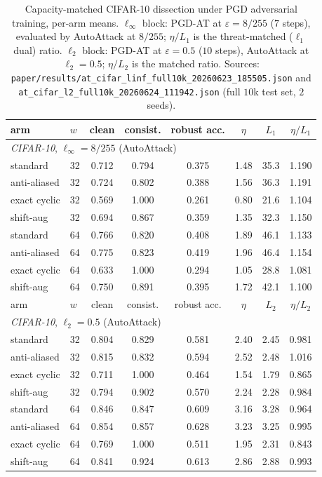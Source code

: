 \begin{table}[t]\centering
\caption{Capacity-matched CIFAR-10 dissection under PGD adversarial training,
per-arm means. $\ell_\infty$ block: PGD-AT at $\varepsilon{=}8/255$ ($7$ steps),
evaluated by AutoAttack at $8/255$; $\eta/L_1$ is the threat-matched ($\ell_1$
dual) ratio. $\ell_2$ block: PGD-AT at $\varepsilon{=}0.5$ ($10$ steps),
AutoAttack at $\ell_2{=}0.5$; $\eta/L_2$ is the matched ratio. Sources:
\texttt{paper/results/at\_cifar\_linf\_full10k\_20260623\_185505.json} and
\texttt{at\_cifar\_l2\_full10k\_20260624\_111942.json} (full $10$k test set,
$2$ seeds).}
\label{tab:at-cifar-full}
\footnotesize
\begin{tabular}{ll ccc cc c}
\toprule
arm & $w$ & clean & consist. & robust acc. & $\eta$ & $L_1$ & $\eta/L_1$ \\
\midrule
\multicolumn{8}{l}{\emph{CIFAR-10}, $\ell_\infty{=}8/255$ (AutoAttack)}\\
standard     & 32 & 0.712 & 0.794 & 0.375 & 1.48 & 35.3 & 1.190 \\
anti-aliased & 32 & 0.724 & 0.802 & 0.388 & 1.56 & 36.3 & 1.191 \\
exact cyclic & 32 & 0.569 & 1.000 & 0.261 & 0.80 & 21.6 & 1.104 \\
shift-aug    & 32 & 0.694 & 0.867 & 0.359 & 1.35 & 32.3 & 1.150 \\
standard     & 64 & 0.766 & 0.820 & 0.408 & 1.89 & 46.1 & 1.133 \\
anti-aliased & 64 & 0.775 & 0.823 & 0.419 & 1.96 & 46.4 & 1.154 \\
exact cyclic & 64 & 0.633 & 1.000 & 0.294 & 1.05 & 28.8 & 1.081 \\
shift-aug    & 64 & 0.750 & 0.891 & 0.395 & 1.72 & 42.1 & 1.100 \\
\midrule
arm & $w$ & clean & consist. & robust acc. & $\eta$ & $L_2$ & $\eta/L_2$ \\
\midrule
\multicolumn{8}{l}{\emph{CIFAR-10}, $\ell_2{=}0.5$ (AutoAttack)}\\
standard     & 32 & 0.804 & 0.829 & 0.581 & 2.40 & 2.45 & 0.981 \\
anti-aliased & 32 & 0.815 & 0.832 & 0.594 & 2.52 & 2.48 & 1.016 \\
exact cyclic & 32 & 0.711 & 1.000 & 0.464 & 1.54 & 1.79 & 0.865 \\
shift-aug    & 32 & 0.794 & 0.902 & 0.570 & 2.24 & 2.28 & 0.984 \\
standard     & 64 & 0.846 & 0.847 & 0.609 & 3.16 & 3.28 & 0.964 \\
anti-aliased & 64 & 0.854 & 0.857 & 0.628 & 3.23 & 3.25 & 0.995 \\
exact cyclic & 64 & 0.769 & 1.000 & 0.511 & 1.95 & 2.31 & 0.843 \\
shift-aug    & 64 & 0.841 & 0.924 & 0.613 & 2.86 & 2.88 & 0.993 \\
\bottomrule
\end{tabular}
\end{table}

